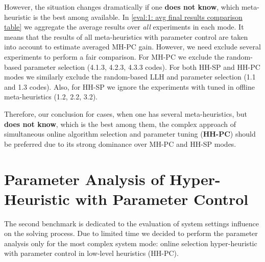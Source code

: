 However, the situation changes dramatically if one \textbf{does not know}, which meta-heuristic is the best among available. In \cref{eval:1: avg final results comparison table} we aggregate the average results over \emph{all} experiments in each mode. It means that the results of all meta-heuristics with parameter control are taken into account to estimate averaged MH-PC gain. However, we need exclude several experiments to perform a fair comparison. For MH-PC we exclude the random-based parameter selection (4.1.3, 4.2.3, 4.3.3 codes). For both HH-SP and HH-PC modes we similarly exclude the random-based LLH and parameter selection (1.1 and 1.3 codes). Also, for HH-SP we ignore the experiments with tuned in offline meta-heuristics (1.2, 2.2, 3.2).

Therefore, our conclusion for cases, when one has several meta-heuristics, but \textbf{does not know}, which is the best among them, the complex approach of simultaneous online algorithm selection and parameter tuning (\textbf{HH-PC}) should be preferred due to its strong dominance over MH-PC and HH-SP modes.

\section{Parameter Analysis of Hyper-Heuristic with Parameter Control}\label{eval:2}
The second benchmark is dedicated to the evaluation of system settings influence on the solving process.
Due to limited time we decided to perform the parameter analysis only for the most complex system mode: online selection hyper-heuristic with parameter control in low-level heuristics (HH-PC).

